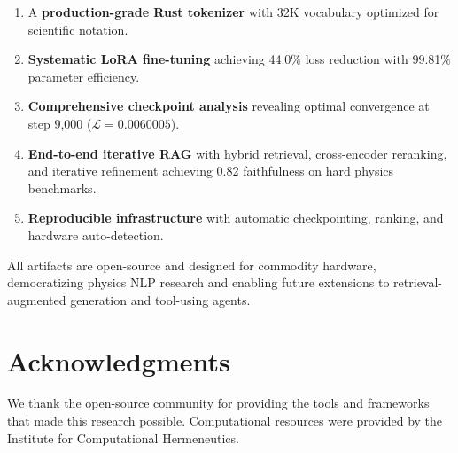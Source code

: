 \documentclass[11pt,a4paper]{article}
\theoremstyle{plain}
\theoremstyle{definition}
\newcommand{\loss}{\mathcal{L}}
\begin{document}
\begin{enumerate}[leftmargin=*,itemsep=2pt]
    \item A \textbf{production-grade Rust tokenizer} with 32K vocabulary
    optimized for scientific notation.

    \item \textbf{Systematic LoRA fine-tuning} achieving 44.0\% loss
    reduction with 99.81\% parameter efficiency.

    \item \textbf{Comprehensive checkpoint analysis} revealing optimal
    convergence at step 9,000 ($\loss = 0.0060005$).

    \item \textbf{End-to-end iterative RAG} with hybrid retrieval,
    cross-encoder reranking, and iterative refinement achieving 0.82
    faithfulness on hard physics benchmarks.

    \item \textbf{Reproducible infrastructure} with automatic
    checkpointing, ranking, and hardware auto-detection.
\end{enumerate}

All artifacts are open-source and designed for commodity hardware,
democratizing physics NLP research and enabling future extensions
to retrieval-augmented generation and tool-using agents.

\section*{Acknowledgments}
We thank the open-source community for providing the tools and
frameworks that made this research possible. Computational
resources were provided by the Institute for Computational
Hermeneutics.
\end{document}

